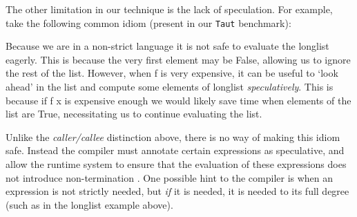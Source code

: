 The other limitation in our technique is the lack of speculation. For example,
take the following common idiom (present in our \verb|Taut| benchmark):

\begin{haskell}
\end{haskell}

Because we are in a non-strict language it is not safe to evaluate the
\<longlist\> eagerly. This is because the very first element may be \<False\>,
allowing us to ignore the rest of the list. However, when \<f\> is very
expensive, it can be useful to `look ahead' in the list and compute some
elements of \<longlist\> \emph{speculatively}. This is because if \<f x\> is
expensive enough we would likely save time when elements of the list are
\<True\>, necessitating us to continue evaluating the list.

Unlike the \emph{caller/callee} distinction above, there is no way of making
this idiom safe.  Instead the compiler must annotate certain expressions as
speculative, and allow the runtime system to ensure that the evaluation of
these expressions does not introduce non-termination
\citep{checkland1994speculative, mattson1993effective}. One possible hint to
the compiler is when an expression is not strictly needed, but \emph{if} it is
needed, it is needed to its full degree (such as in the \<longlist\> example
above).
